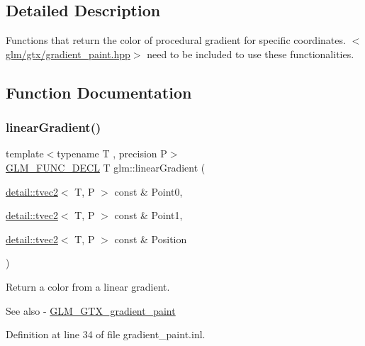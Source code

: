 \subsection{Detailed Description}
Functions that return the color of procedural gradient for specific coordinates. $<$\hyperlink{gradient__paint_8hpp}{glm/gtx/gradient\+\_\+paint.\+hpp}$>$ need to be included to use these functionalities. 



\subsection{Function Documentation}
\mbox{\label{group__gtx__gradient__paint_ga01eb377864e98f86bd44378e1b86eb22}} 
\subsubsection{\texorpdfstring{linear\+Gradient()}{linearGradient()}}
{\footnotesize\ttfamily template$<$typename T , precision P$>$ \\
\hyperlink{setup_8hpp_ab2d052de21a70539923e9bcbf6e83a51}{G\+L\+M\+\_\+\+F\+U\+N\+C\+\_\+\+D\+E\+CL} T glm\+::linear\+Gradient (\begin{DoxyParamCaption}\item[{\hyperlink{structglm_1_1detail_1_1tvec2}{detail\+::tvec2}$<$ T, P $>$ const \&}]{Point0,  }\item[{\hyperlink{structglm_1_1detail_1_1tvec2}{detail\+::tvec2}$<$ T, P $>$ const \&}]{Point1,  }\item[{\hyperlink{structglm_1_1detail_1_1tvec2}{detail\+::tvec2}$<$ T, P $>$ const \&}]{Position }\end{DoxyParamCaption})}

Return a color from a linear gradient. \begin{DoxySeeAlso}{See also}
-\/ \hyperlink{group__gtx__gradient__paint}{G\+L\+M\+\_\+\+G\+T\+X\+\_\+gradient\+\_\+paint} 
\end{DoxySeeAlso}


Definition at line 34 of file gradient\+\_\+paint.\+inl.

\mbox{\label{group__gtx__gradient__paint_ga864c46234e363137b717119231f422f6}} 
